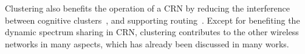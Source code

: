 \documentclass[times]{ettauth}
\newcommand{\ie}{i.e., }
\theoremstyle{mytheoremstyle}
\theoremstyle{mytheoremstyle}
\theoremstyle{mytheoremstyle}
\begin{document}
Clustering also benefits the operation of a CRN by reducing the interference between cognitive clusters~\cite{centralizedSharing80222}, and supporting routing~\cite{Abbasi_survey_07}.
Except for benefiting the dynamic spectrum sharing in CRN, clustering contributes to the other wireless networks in many aspects, which has already been discussed in many works.

\end{document}

